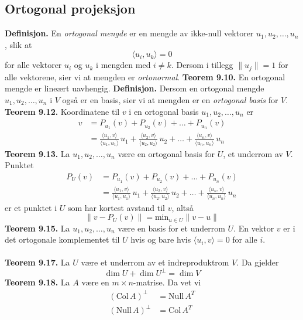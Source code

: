 \documentclass{article}
\begin{document}
\subsection{Ortogonal projeksjon}
\textbf{Definisjon.} En \textit{ortogonal mengde} er en mengde av ikke-null vektorer $u_1, u_2, \dots, u_n$, slik at
\[ \langle u_i, u_k \rangle = 0 \]
for alle vektorer $u_i$ og $u_k$ i mengden med $i \neq k$. Dersom i tillegg $\lVert u_j \rVert = 1$ for alle vektorene, sier vi at mengden er \textit{ortonormal}.
\textbf{Teorem 9.10.} En ortogonal mengde er lineært uavhengig.
\textbf{Definisjon.} Dersom en ortogonal mengde $u_1, u_2, \dots, u_n$ i $V$ også er en basis, sier vi at mengden er en \textit{ortogonal basis} for $V$.
\textbf{Teorem 9.12.} Koordinatene til $v$ i en ortogonal basis $u_1, u_2, \dots, u_n$ er
\begin{align*}
    v &= P_{u_1}(v) + P_{u_2}(v) + \dots + P_{u_n}(v) \\
    &= \frac{\langle u_1, v \rangle}{\langle u_1, u_1 \rangle}\,u_1
    + \frac{\langle u_2, v \rangle}{\langle u_2, u_2 \rangle}\,u_2
    + \dots + \frac{\langle u_n, v \rangle}{\langle u_n, u_n \rangle}\,u_n
\end{align*}
\textbf{Teorem 9.13.} La $u_1, u_2, \dots, u_n$ være en ortogonal basis for $U$, et underrom av $V$. Punktet
\begin{align*}
    P_U(v) &= P_{u_1}(v) + P_{u_2}(v) + \dots + P_{u_n}(v) \\
    &= \frac{\langle u_1, v \rangle}{\langle u_1, u_1 \rangle}\,u_1
    + \frac{\langle u_2, v \rangle}{\langle u_2, u_2 \rangle}\,u_2
    + \dots + \frac{\langle u_n, v \rangle}{\langle u_n, u_n \rangle}\,u_n
\end{align*}
er et punktet i $U$ som har kortest avstand til $v$, altså
\[ \lVert v - P_U(v) \rVert = \text{min}_{u \in U} \lVert v - u \rVert \]
\textbf{Teorem 9.15.} La $u_1, u_2, \dots, u_n$ være en basis for et underrom $U$. En vektor $v$ er i det ortogonale komplementet til $U$ hvis og bare hvis $\langle u_i, v \rangle = 0$ for alle $i$.
\\\\
\textbf{Teorem 9.17.} La $U$ være et underrom av et indreproduktrom $V$. Da gjelder
\[ \dim{U} + \dim{U^\perp} = \dim{V} \]
\textbf{Teorem 9.18.} La $A$ være en $m \times n$-matrise. Da vet vi
\begin{align*}
    (\text{Col}\,A)^\perp &= \text{Null}\,A^T \\
    (\text{Null}\,A)^\perp &= \text{Col}\,A^T
\end{align*}
\end{document}
